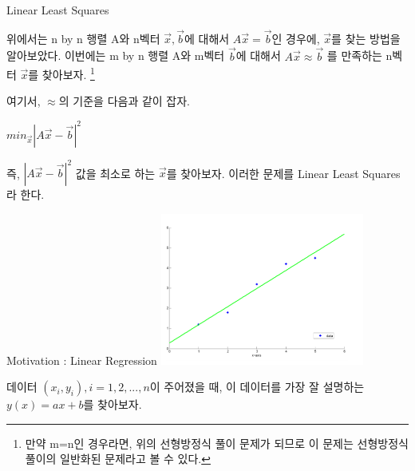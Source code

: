 \documentclass{beamer}
\begin{document}



\begin{frame}{Linear Least Squares} 

위에서는 n by n 행렬 A와 n벡터 $\vec{x}, \vec{b}$에 대해서 $A\vec{x} = \vec{b}$인 경우에, $\vec{x}$를 찾는 방법을 알아보았다. 이번에는 m by n 행렬 A와 m벡터 $\vec{b}$에 대해서 $A\vec{x} \approx \vec{b}$ 를 만족하는 n벡터 $\vec{x}$를 찾아보자. \footnote{만약 m=n인 경우라면, 위의 선형방정식 풀이 문제가 되므로 이 문제는 선형방정식 풀이의 일반화된 문제라고 볼 수 있다.} 

여기서, $\approx$의 기준을 다음과 같이 잡자. 

\vspace{5mm}

$ min_{\vec{x}} |A\vec{x} - \vec{b}|^2 $ 

\vspace{5mm}

즉, $|A\vec{x} - \vec{b}|^2 $ 값을 최소로 하는 $\vec{x}$를 찾아보자. 
\vspace{5mm}
이러한 문제를 Linear Least Squares라 한다. 

\end{frame}


\begin{frame}{Motivation : Linear Regression} 
\includegraphics[height=5cm,keepaspectratio]{lin}

데이터 $(x_i, y_i), i=1,2,...,n$이 주어졌을 때, 이 데이터를 가장 잘 설명하는 $y(x) = ax + b$를 찾아보자. 
\end{frame}
\end{document}
